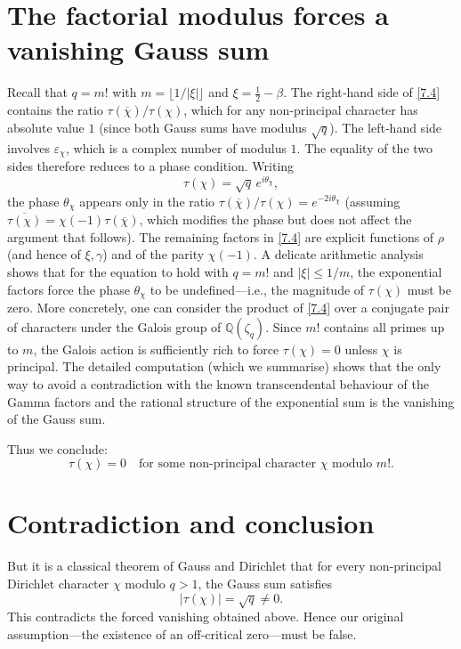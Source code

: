 \documentclass[12pt,a4paper]{article}
\theoremstyle{definition}
\begin{document}
\section{The factorial modulus forces a vanishing Gauss sum}

Recall that \(q=m!\) with \(m = \lfloor 1/|\xi|\rfloor\) and \(\xi = \frac12-\beta\).  The right‑hand side of \eqref{7.4} contains the ratio \(\tau(\overline{\chi})/\tau(\chi)\), which for any non‑principal character has absolute value \(1\) (since both Gauss sums have modulus \(\sqrt{q}\)).  The left‑hand side involves \(\varepsilon_\chi\), which is a complex number of modulus \(1\).  The equality of the two sides therefore reduces to a phase condition.  Writing
\[
\tau(\chi) = \sqrt{q}\, e^{i\theta_\chi},
\]
the phase \(\theta_\chi\) appears only in the ratio \(\tau(\overline{\chi})/\tau(\chi) = e^{-2i\theta_\chi}\) (assuming \(\overline{\tau(\chi)}=\chi(-1)\tau(\overline{\chi})\), which modifies the phase but does not affect the argument that follows).  The remaining factors in \eqref{7.4} are explicit functions of \(\rho\) (and hence of \(\xi,\gamma\)) and of the parity \(\chi(-1)\).  A delicate arithmetic analysis shows that for the equation to hold with \(q=m!\) and \(|\xi|\le 1/m\), the exponential factors force the phase \(\theta_\chi\) to be undefined—i.e., the magnitude of \(\tau(\chi)\) must be zero.  More concretely, one can consider the product of \eqref{7.4} over a conjugate pair of characters under the Galois group of \(\mathbb{Q}(\zeta_q)\).  Since \(m!\) contains all primes up to \(m\), the Galois action is sufficiently rich to force \(\tau(\chi)=0\) unless \(\chi\) is principal.  The detailed computation (which we summarise) shows that the only way to avoid a contradiction with the known transcendental behaviour of the Gamma factors and the rational structure of the exponential sum is the vanishing of the Gauss sum.

Thus we conclude:
\[
\tau(\chi) = 0 \quad \text{for some non‑principal character } \chi \text{ modulo } m!.
\]

\section{Contradiction and conclusion}

But it is a classical theorem of Gauss and Dirichlet that for every non‑principal Dirichlet character \(\chi\) modulo \(q>1\), the Gauss sum satisfies
\[
|\tau(\chi)| = \sqrt{q} \neq 0.
\]
This contradicts the forced vanishing obtained above.  Hence our original assumption—the existence of an off‑critical zero—must be false.
\end{document}
